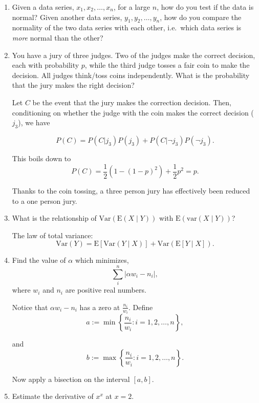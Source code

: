 \documentclass{amsart}
\theoremstyle{plain}
\numberwithin{equation}{section}
\begin{document}
\begin{enumerate}
\item Given a data series, $x_1, x_2, \ldots, x_n$, for 
a large $n$, how do you test if the data is normal? Given 
another data series, $y_1, y_2, \ldots, y_n$, how do you 
compare the normality of the two data series with each other, 
i.e.\ which data series is \emph{more} normal than the other?

\item You have a jury of three judges. Two of the judges
make the correct decision, each with probability $p$, while
the third judge tosses a fair coin to make the decision. 
All judges think/toss coins independently. What is the 
probability that the jury makes the right decision?

Let $C$ be the event that the jury makes the correction decision. 
Then, conditioning on whether the judge with the coin
makes the correct decision  ($j_3$), we have

$$P(C) = P(C|j_3) P(j_3)+P(C|\neg j_3)P(\neg j_3).$$

This boils down to
$$P(C) = \frac{1}{2}\left(1-(1-p)^2\right) + \frac{1}{2} p^2 = p.$$

Thanks to the coin tossing, a three person jury has 
effectively been reduced to a one person jury. 


\item What is the relationship of $\mathrm{Var}(\mathrm{E}(X\mid Y))$ with
$\mathrm{E}(\mathrm{var}(X\mid Y))$?

The law of total variance:
$$\mathrm{Var}(Y)=\mathrm{E}[\mathrm{Var}(Y\mid X)]+
\mathrm{Var}(\mathrm{E}[Y\mid X]).$$

\item Find the value of $\alpha$ which minimizes,
\begin{equation*}
\sum_{i}^{n} \left|\alpha w_i - n_i\right|,
\end{equation*}
where $w_i$ and $n_i$ are positive real numbers.

Notice that $\alpha w_i - n_i$ has a zero at $\frac{n_i}{w_i}$. 
Define 
\begin{equation*}
a := \min \left\{ \frac{n_i}{w_i}: i = 1, 2, \ldots, n \right\},
\end{equation*}

and 
$$b := \max \left\{ \frac{n_i}{w_i}: i = 1, 2, \ldots, n \right\}.$$

Now apply a bisection on the interval $[a, b]$.

\item Estimate the derivative of $x^x$ at $x=2$.


\end{enumerate}
\end{document}
